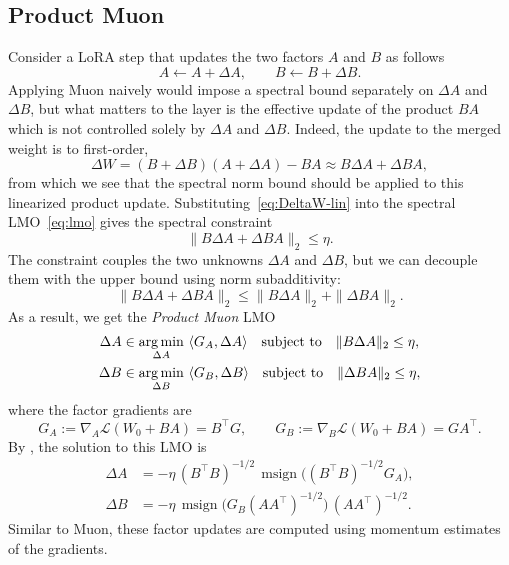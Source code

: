 \documentclass[11pt]{article}
\DeclareMathOperator*{\argmin}{arg\,min}
\newcommand{\ip}[1]{\langle #1 \rangle}
\DeclareMathOperator{\msign}{msign}
\newcommand{\norm}[1]{\| #1\|}
\theoremstyle{plain}
\theoremstyle{definition}
\theoremstyle{remark}
\theoremstyle{definition}
\begin{document}
\subsection{Product Muon}\label{sec:product-muon}
Consider a LoRA step that updates the two factors $A$ and $B$ as follows
\[
A \leftarrow A + \Delta A,
\qquad
B \leftarrow B + \Delta B.
\]
Applying Muon naively would impose a spectral bound separately on $\Delta A$ and $\Delta B$, but what matters to the layer is the effective update of the product $BA$ which is not controlled solely by $\Delta A$ and $\Delta B$. Indeed, the update to the merged weight is to first-order,
\begin{equation} \label{eq:DeltaW-lin}
\Delta W = (B + \Delta B)(A + \Delta A) - BA \approx B \Delta A + \Delta B A,
\end{equation}
from which we see that the spectral norm bound should be applied to this linearized product update. Substituting~\eqref{eq:DeltaW-lin} into the spectral LMO~\eqref{eq:lmo} gives the spectral constraint
\[
\norm{B \Delta A + \Delta B A}_2
\le \eta.
\]
The constraint couples the two unknowns $\Delta A$ and $\Delta B$, but we can decouple them with the upper bound using norm subadditivity:
\[
\norm{B \Delta A + \Delta B A}_2
\le
\norm{B \Delta A}_2 + \norm{\Delta B A}_2.
\]
As a result, we get the \emph{Product Muon} LMO
\begin{equation}
  \begin{aligned}
  \Delta A &\in \argmin_{\Delta A}~ \ip{G_A, \Delta A}
  \quad \textnormal{subject to}\quad
  \norm{B \Delta A}_2\le\eta, \\
  \Delta B &\in \argmin_{\Delta B}~ \ip{G_B, \Delta B}
  \quad \textnormal{subject to}\quad
  \norm{\Delta B A}_2\le\eta,
  \end{aligned}
  \label{eq:decoupled-lora-lmo}
\end{equation}
where the factor gradients are
\begin{equation}\label{e-grad-wrt-factors}
    G_A := \nabla_A \mathcal{L}(W_0+BA) = B^\top G,
    \qquad
    G_B := \nabla_B \mathcal{L}(W_0+BA) = G A^\top.
\end{equation}
By , the solution to this LMO is
\begin{equation}\label{eq:product-muon-step}
\begin{aligned}
    \Delta A &= -\eta\,(B^\top B)^{-1/2}\,\msign\!\big((B^\top B)^{-1/2} G_A\big), \\
    \Delta B &= -\eta\,\msign\!\big(G_B (A A^\top)^{-1/2}\big)\,(A A^\top)^{-1/2}.
\end{aligned}
\end{equation}
Similar to Muon, these factor updates are computed using momentum estimates of the  gradients.
\end{document}
